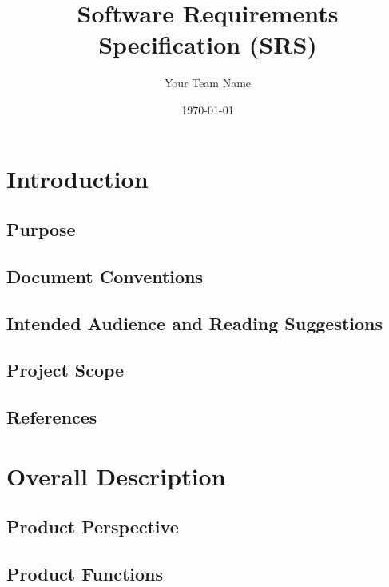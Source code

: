 \documentclass{article}
\title{Software Requirements Specification (SRS)}
\author{Your Team Name}
\date{\today}
\begin{document}
\maketitle

\tableofcontents
\newpage

\section{Introduction}
\subsection{Purpose}

\subsection{Document Conventions}

\subsection{Intended Audience and Reading Suggestions}

\subsection{Project Scope}

\subsection{References}

\newpage
\section{Overall Description}
\subsection{Product Perspective}

\subsection{Product Functions}
\end{document}
